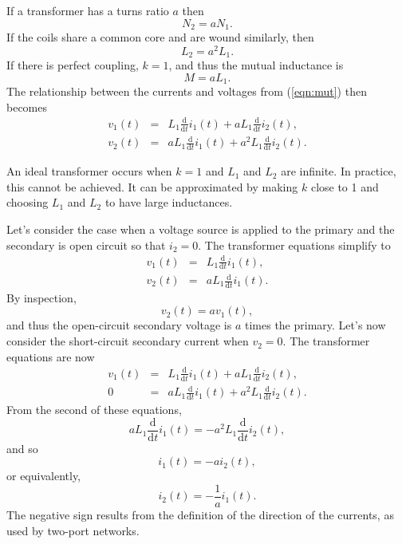 \documentclass[a4paper, 12pt]{article}
\newcommand{\ud}{\mathrm{d}}
\newcommand{\udby}[1]{\frac{\ud}{\ud #1}}
\newcommand{\refeqn}[1]{\mbox{(\ref{eqn:#1})}}
\begin{document}
If a transformer has a turns ratio $a$ then
%
\begin{equation}
N_2 = a N_1.
\end{equation}
%
If the coils share a common core and are wound similarly, then
%
\begin{equation}
  L_2 = a^2 L_1.
\end{equation}
%
If there is perfect coupling, $k=1$, and thus the mutual inductance is
%
\begin{equation}
  M = a L_1.
\end{equation}
%
The relationship between the currents and voltages from \refeqn{mut}
then becomes
%
\begin{eqnarray}
 v_1(t) & = & L_1 \udby{t} i_1(t) + a L_1 \udby{t} i_2(t),\\
 v_2(t) & = & a L_1 \udby{t} i_1(t) + a^2 L_1 \udby{t} i_2(t).
\label{eqn:mut_transformer}
\end{eqnarray}


An ideal transformer occurs when $k=1$ and $L_1$ and $L_2$ are
infinite.  In practice, this cannot be achieved.  It can be
approximated by making $k$ close to 1 and choosing $L_1$ and $L_2$
to have large inductances.

Let's consider the case when a voltage source is applied to the
primary and the secondary is open circuit so that $i_2=0$.  The
transformer equations simplify to
%
\begin{eqnarray}
 v_1(t) & = & L_1 \udby{t} i_1(t),\\
 v_2(t) & = & a L_1 \udby{t} i_1(t).
\label{eqn:mut_transformer_oc}
\end{eqnarray}
%
By inspection,
%
\begin{equation}
v_2(t) = a v_1(t),
\end{equation}
%
and thus the open-circuit secondary voltage is $a$ times the primary.
Let's now consider the short-circuit secondary current when $v_2=0$.
The transformer equations are now
%
\begin{eqnarray}
 v_1(t) & = & L_1 \udby{t} i_1(t) + a L_1 \udby{t} i_2(t),\\
      0 & = & a L_1 \udby{t} i_1(t) + a^2 L_1 \udby{t} i_2(t).
\label{eqn:mut_transformer_sc}
\end{eqnarray}
%
From the second of these equations,
%
\begin{equation}
  a L_1 \udby{t} i_1(t) = -a^2 L_1 \udby{t} i_2(t),
\end{equation}
%
and so
%
\begin{equation}
  i_1(t) = -a i_2(t),
\end{equation}
%
or equivalently,
%
\begin{equation}
  i_2(t) = -\frac{1}{a} i_1(t).
\end{equation}
%
The negative sign results from the definition of the direction of the
currents, as used by two-port networks.
\end{document}
